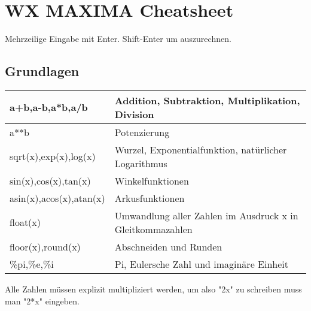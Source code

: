 \documentclass[../main.tex]{subfiles}
\begin{document}

\chapter{WX MAXIMA Cheatsheet}
Mehrzeilige Eingabe mit Enter. Shift-Enter um auszurechnen.

\section{Grundlagen}
\begin{tabularx}{1.0\textwidth} { 
    >{\centering\arraybackslash}X 
    >{\centering\arraybackslash}X  }
    a+b,a-b,a*b,a/b & Addition, Subtraktion, Multiplikation, Division
    \\ [7pt]
    \hline
    a**b & Potenzierung
    \\ [7pt]
    \hline
    sqrt(x),exp(x),log(x) & Wurzel, Exponentialfunktion, natürlicher Logarithmus
    \\ [7pt]
    \hline
    sin(x),cos(x),tan(x) & Winkelfunktionen
    \\ [7pt]
    \hline
    asin(x),acos(x),atan(x) & Arkusfunktionen
    \\ [7pt]
    \hline
    float(x) & Umwandlung aller Zahlen im Ausdruck x in Gleitkommazahlen
    \\ [7pt]
    \hline
    floor(x),round(x) & Abschneiden und Runden
    \\ [7pt]
    \hline
    \%pi,\%e,\%i & Pi, Eulersche Zahl und imaginäre Einheit
    \\ [20pt]
\end{tabularx}
Alle Zahlen müssen explizit multipliziert werden, um also "2x" zu schreiben muss man "2*x" eingeben.
\end{document}
